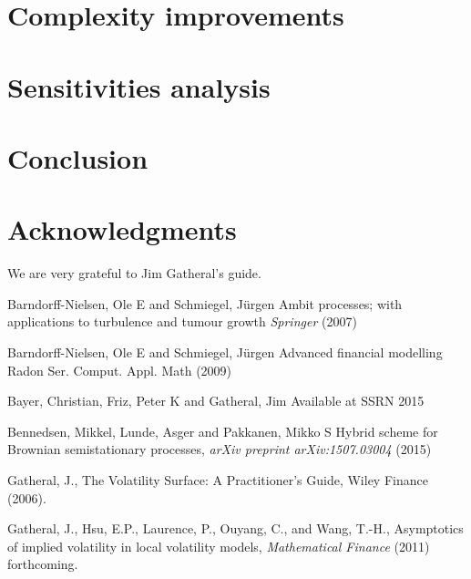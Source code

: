 \documentclass[12pt]{article}
\numberwithin{equation}{section}
\begin{document}
\section{Complexity improvements}

\section{Sensitivities analysis}


\section{Conclusion}



\section*{Acknowledgments}

We are very grateful to Jim Gatheral's guide.

%
%
%
%

\begin{thebibliography}{}

{Barndorff-Nielsen, Ole E} and {Schmiegel, J{\"u}rgen}
{Ambit processes; with applications to turbulence and tumour growth}
{\it Springer} (2007)

{Barndorff-Nielsen, Ole E} and {Schmiegel, J{\"u}rgen}
{Advanced financial modelling}
{Radon Ser. Comput. Appl. Math} (2009)

{Bayer, Christian}, {Friz, Peter K} and {Gatheral, Jim}
{Available at SSRN}
{2015}

{Bennedsen, Mikkel}, {Lunde, Asger} and {Pakkanen, Mikko S}
{Hybrid scheme for Brownian semistationary processes},
{\it arXiv preprint arXiv:1507.03004} (2015)

 { Gatheral, J.},
{The Volatility Surface: A Practitioner's Guide},
{Wiley Finance} (2006).

{ Gatheral, J.}, { Hsu, E.P.}, { Laurence, P.}, { Ouyang, C.}, and { Wang, T.-H.},
{Asymptotics of implied volatility in local volatility models},
{\it Mathematical Finance} (2011) forthcoming.

\end{thebibliography}
\end{document}
